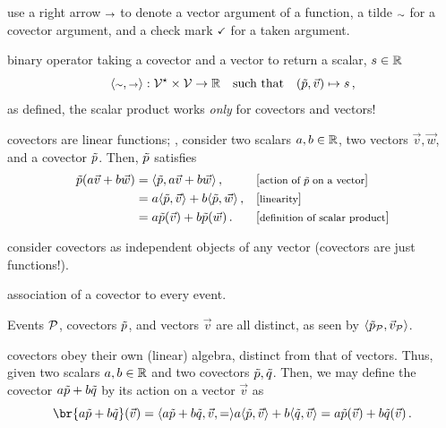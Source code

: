  use a right arrow ${\scriptstyle\rightarrow}$ to denote a vector argument of a function, a tilde ${\scriptstyle\sim}$ for a covector argument, and a check mark ${\scriptstyle\checkmark}$ for a taken argument.

 binary operator taking a covector and a vector to return a scalar, $s\in\mathbb{R}$
%
\begin{equation*}
  \fdef{\sprod\cslot\vslot}{\dlspace V\setprod\lspace V}{\rspace}\suchthat\fmap{\tuple{\cov p, \vec v}}{s}\,,
\end{equation*}
%
 as defined, the scalar product works \emph{only} for covectors and vectors!

 covectors are linear functions; \ie, consider two scalars $a,b\in\mathbb{R}$, two vectors $\vec v,\vec w$, and a covector $\tilde{p}$. Then, $\tilde{p}$ satisfies
%
\begin{align}\label{eq:covectorpropertiesasmap}
  \cov p\vat{a\vec v + b\vec w} &= \sprod{\cov p}{a\vec v + b\vec w}                  \,, && \eqtxt{action of $\cov p$ on a vector} \\\nonumber
                                &= a\sprod{\cov p}{\vec v} + b\sprod{\cov p}{\vec w}  \,, && \eqtxt{linearity}              \\\nonumber
                                &= a\cov p\vat{\vec v} + b\cov p\vat{\vec w}          \,. && \eqtxt{definition of scalar product} \nonumber
\end{align}

 consider covectors as independent objects of any vector (covectors are just functions!).

 association of a covector to every event.

 Events $\mathcal{P}$, covectors $\tilde{p}$, and vectors $\vec v$ are all distinct, as seen by $\sprod{\cov p_\event{P}}{\vec v_\event{P}}$.

 covectors obey their own (linear) algebra, distinct from that of vectors. Thus, given two scalars $a,b\in\mathbb{R}$ and two covectors $\tilde{p},\tilde{q}$. Then, we may define the covector $a\tilde{p} + b\tilde{q}$ by its action on a vector $\vec v$ as
%
\begin{equation}\label{eq:dualvectorspace}
  \br{a\cov p + b\cov q}\vat{\vec v} = \sprod{a\cov p + b\cov q, \vec v} 
                                     = a\sprod{\cov p}{\vec v} + b\sprod{\cov q}{\vec v}
                                     = a\cov p\vat{\vec v} + b\cov q\vat{\vec v}\,.
\end{equation}

